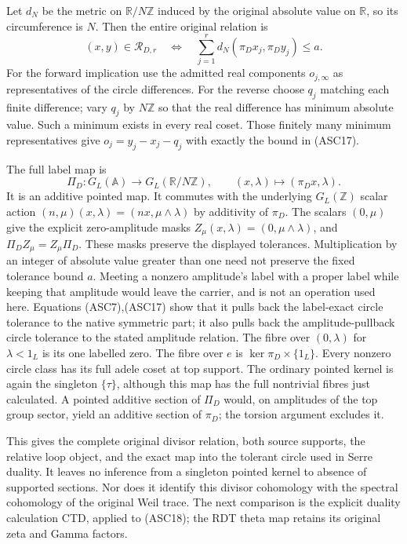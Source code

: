 Let $d_N$ be the metric on $\mathbb R/N\mathbb Z$ induced by
the original absolute value on $\mathbb R$, so its circumference
is $N$. Then the entire original relation is
\begin{equation}\tag{ASC17}
(x,y)\in\mathcal R_{D,r}\quad\Longleftrightarrow\quad
\sum_{j=1}^r d_N(\pi_Dx_j,\pi_Dy_j)\le a.
\end{equation}
For the forward implication use the admitted real components
$o_{j,\infty}$ as representatives of the circle differences.
For the reverse choose $q_j$ matching each finite difference;
vary $q_j$ by $N\mathbb Z$ so that the real difference has
minimum absolute value. Such a minimum exists in every real
coset. Those finitely many minimum representatives give
$o_j=y_j-x_j-q_j$ with exactly the bound in (ASC17).

The full label map is
\begin{equation}\tag{ASC18}
\Pi_D:G_L(\mathbb A)\longrightarrow G_L(\mathbb R/N\mathbb Z),
\qquad (x,\lambda)\longmapsto(\pi_Dx,\lambda).
\end{equation}
It is an additive pointed map. It commutes with the underlying
$G_L(\mathbb Z)$ scalar action
$(n,\mu)(x,\lambda)=(nx,\mu\wedge\lambda)$ by additivity of
$\pi_D$. The scalars $(0,\mu)$ give the explicit zero-amplitude masks
$Z_\mu(x,\lambda)=(0,\mu\wedge\lambda)$, and
$\Pi_DZ_\mu=Z_\mu\Pi_D$. These masks preserve the displayed
tolerances. Multiplication by an integer of absolute value greater
than one need not preserve the fixed tolerance bound $a$. Meeting
a nonzero amplitude's label with a proper label while keeping that
amplitude would leave the carrier, and is not an operation used here.
Equations (ASC7),(ASC17)
show that it pulls back the label-exact circle tolerance to the
native symmetric part; it also pulls back the amplitude-pullback
circle tolerance to the stated amplitude relation. The fibre
over $(0,\lambda)$ for $\lambda<1_L$ is its one labelled zero.
The fibre over $e$ is $\ker\pi_D\times\{1_L\}$. Every nonzero
circle class has its full adele coset at top support. The
ordinary pointed kernel is again the singleton $\{\tau\}$,
although this map has the full nontrivial fibres just calculated.
A pointed additive section of $\Pi_D$ would, on amplitudes of
the top group sector, yield an additive section of $\pi_D$;
the torsion argument excludes it.

This gives the complete original divisor relation, both source
supports, the relative loop object, and the exact map into the
tolerant circle used in Serre duality. It leaves no inference
from a singleton pointed kernel to absence of supported sections.
Nor does it identify this divisor cohomology with the spectral
cohomology of the original Weil trace. The next comparison is
the explicit duality calculation CTD, applied to (ASC18); the
RDT theta map retains its original zeta and Gamma factors.
